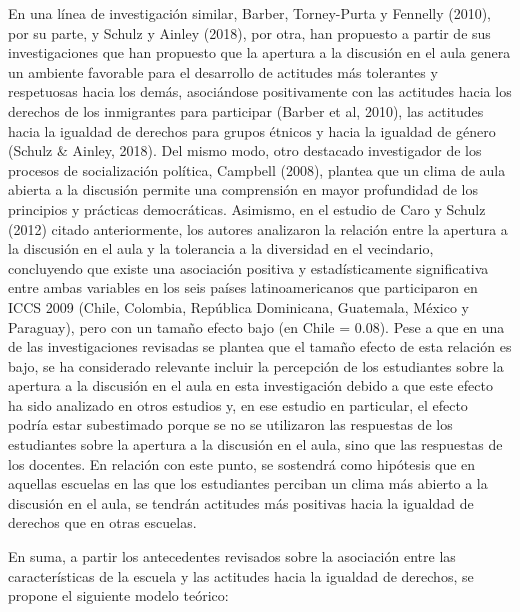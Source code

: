 \documentclass[12pt,twoside]{templates/facsothesis}
\begin{document}
En una línea de investigación similar, Barber, Torney-Purta y Fennelly (2010), por su parte, y Schulz y Ainley (2018), por otra, han propuesto a partir de sus investigaciones que han propuesto que la apertura a la discusión en el aula genera un ambiente favorable para el desarrollo de actitudes más tolerantes y respetuosas hacia los demás, asociándose positivamente con las actitudes hacia los derechos de los inmigrantes para participar (Barber et al, 2010), las actitudes hacia la igualdad de derechos para grupos étnicos y hacia la igualdad de género (Schulz \& Ainley, 2018). Del mismo modo, otro destacado investigador de los procesos de socialización política, Campbell (2008), plantea que un clima de aula abierta a la discusión permite una comprensión en mayor profundidad de los principios y prácticas democráticas. Asimismo, en el estudio de Caro y Schulz (2012) citado anteriormente, los autores analizaron la relación entre la apertura a la discusión en el aula y la tolerancia a la diversidad en el vecindario, concluyendo que existe una asociación positiva y estadísticamente significativa entre ambas variables en los seis países latinoamericanos que participaron en ICCS 2009 (Chile, Colombia, República Dominicana, Guatemala, México y Paraguay), pero con un tamaño efecto bajo (en Chile = 0.08). Pese a que en una de las investigaciones revisadas se plantea que el tamaño efecto de esta relación es bajo, se ha considerado relevante incluir la percepción de los estudiantes sobre la apertura a la discusión en el aula en esta investigación debido a que este efecto ha sido analizado en otros estudios y, en ese estudio en particular, el efecto podría estar subestimado porque se no se utilizaron las respuestas de los estudiantes sobre la apertura a la discusión en el aula, sino que las respuestas de los docentes. En relación con este punto, se sostendrá como hipótesis que en aquellas escuelas en las que los estudiantes perciban un clima más abierto a la discusión en el aula, se tendrán actitudes más positivas hacia la igualdad de derechos que en otras escuelas.

En suma, a partir los antecedentes revisados sobre la asociación entre las características de la escuela y las actitudes hacia la igualdad de derechos, se propone el siguiente modelo teórico:
\end{document}
